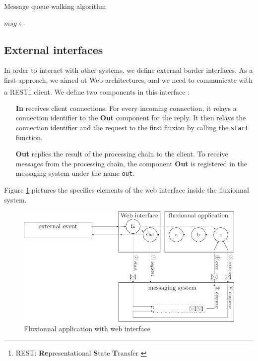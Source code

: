 \begin{algorithm}
\caption{Message queue walking algorithm}
\label{alg:parcours}
\begin{algorithmic}
\State $msg \gets$  
\State {}
\EndWhile
\EndFunction
\end{algorithmic}
\end{algorithm}

\subsection{External interfaces}

In order to interact with other systems, we define external border interfaces.
As a first approach, we aimed at Web architectures, and we need to communicate with a REST\footnote{REST: \textbf{Re}presentational \textbf{S}tate \textbf{T}ransfer \cite{Fielding2002}} client.
We define two components in this interface :

\begin{itemize}
	\item[\textbf{In}]
    receives client connections.
    For every incoming connection, it relays a connection identifier to the \textbf{Out} component for the reply.
    It then relays the connection identifier and the request to the first fluxion by calling the \texttt{start} function.
	\item[\textbf{Out}]
    replies the result of the processing chain to the client.
    To receive messages from the processing chain, the component \textbf{Out} is registered in the messaging system under the name \texttt{out}.
\end{itemize}

Figure \ref{fig:schemaweb} pictures the specifics elements of the web interface inside the fluxionnal system.

\begin{figure}[h!]
	\includegraphics[width=\linewidth]{schema-web.pdf}
	\caption{Fluxionnal application with web interface}
	\label{fig:schemaweb}
\end{figure}

